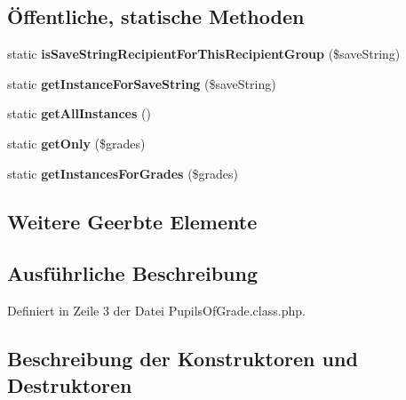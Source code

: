 \subsection*{Öffentliche, statische Methoden}
\begin{DoxyCompactItemize}
\item 
\mbox{\label{class_pupils_of_grade_a537b65ea11e1fcc5a738988b0a9434cd}} 
static {\bfseries is\+Save\+String\+Recipient\+For\+This\+Recipient\+Group} (\$save\+String)
\item 
\mbox{\label{class_pupils_of_grade_ad152b0638378989eabb9c57a7689d42b}} 
static {\bfseries get\+Instance\+For\+Save\+String} (\$save\+String)
\item 
\mbox{\label{class_pupils_of_grade_ad8a797804fd60ab16806401de9bdaea1}} 
static {\bfseries get\+All\+Instances} ()
\item 
\mbox{\label{class_pupils_of_grade_a180619bf9ead2037212fb99c61dc32ae}} 
static {\bfseries get\+Only} (\$grades)
\item 
\mbox{\label{class_pupils_of_grade_aa7e3d909d60dea2cb2b657c4fbf1f70a}} 
static {\bfseries get\+Instances\+For\+Grades} (\$grades)
\end{DoxyCompactItemize}
\subsection*{Weitere Geerbte Elemente}


\subsection{Ausführliche Beschreibung}


Definiert in Zeile 3 der Datei Pupils\+Of\+Grade.\+class.\+php.



\subsection{Beschreibung der Konstruktoren und Destruktoren}
\mbox{\label{class_pupils_of_grade_a78a1e06316d761f5719eee6225088136}} 

